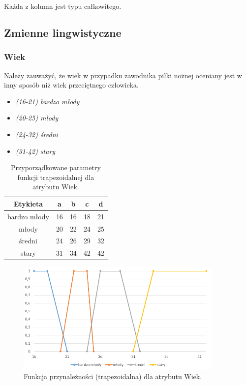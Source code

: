 \documentclass{classrep}
\begin{document}
	Każda z kolumn jest typu całkowitego.

	\subsection{Zmienne lingwistyczne}
	\subsubsection{Wiek}
	Należy zauważyć, że wiek w przypadku zawodnika piłki nożnej oceniany jest w inny sposób niż wiek przeciętnego człowieka.
	\begin{itemize}
		\item \textsl{(16-21) bardzo młody}
		\item \textsl{(20-25) młody}
		\item \textsl{(24-32) średni}
		\item \textsl{(31-42) stary}
	\end{itemize}
	
	\begin{table}[h!]
		\centering
		\begin{tabular} {c c c c c}
			\hline
			\textbf{Etykieta} & \textbf{a} & \textbf{b} & \textbf{c} & \textbf{d} \\ [0.5ex] 
			\hline	
			\hline 
			bardzo młody & 16 & 16 & 18 & 21  \\
			młody & 20 & 22 & 24 & 25  \\
			średni & 24 & 26 & 29 & 32  \\
			stary & 31 & 34 & 42 & 42  \\
			\hline
		\end{tabular}
		\caption{Przyporządkowane parametry funkcji trapezoidalnej dla atrybutu  Wiek. }
		\label{tabelaWiek}
	\end{table}

	\begin{figure}[h!]
		\centering
		\includegraphics[width=0.9\textwidth]{zmienne/1.png}
		\caption{Funkcja przynależności (trapezoidalna) dla atrybutu Wiek.}
		\label{wykresWiek}
	\end{figure}
	
\end{document}
